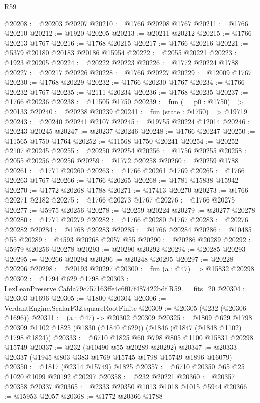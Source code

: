 \begin{lexlean}{R59}
\begin{coremodule}
@20208 := @20203 @20207
@20210 := @1766 @20208 @1767
@20211 := @1766 @20210
@20212 := @1920 @20205
@20213 := @20211 @20212
@20215 := @1766 @20213 @1767
@20216 := @1768 @20215
@20217 := @1766 @20216
@20221 := @5379 @20180 @20183 @20186 @15954
@20222 := @2055 @20221
@20223 := @1923 @20205
@20224 := @20222 @20223
@20226 := @1772 @20224 @1788
@20227 := @20217 @20226
@20228 := @1766 @20227
@20229 := @12009 @1767
@20230 := @1768 @20229
@20232 := @1766 @20230 @1767
@20234 := @1766 @20232 @1767
@20235 := @2111 @20234
@20236 := @1768 @20235
@20237 := @1766 @20236
@20238 := @11505 @1750
@20239 := fun (__p0 : @1750) => @20133
@20240 := @20238 @20239
@20241 := fun (state : @1750) => @19719
@20243 := @20240 @20241 @2107
@20245 := @19755 @20224 @12014
@20246 := @20243 @20245
@20247 := @20237 @20246
@20248 := @1766 @20247
@20250 := @11565 @1750 @1764
@20252 := @11568 @1750 @20241
@20254 := @20252 @2107 @20245
@20255 := @20250 @20254
@20256 := @1756 @20255
@20258 := @2055 @20256 @20256
@20259 := @1772 @20258
@20260 := @20259 @1788
@20261 := @1771 @20260
@20263 := @1766 @20261 @1769
@20265 := @1766 @20263 @1767
@20266 := @1766 @20265
@20268 := @1781 @15838 @15942
@20270 := @1772 @20268 @1788
@20271 := @17413 @20270
@20273 := @1766 @20271 @2182
@20275 := @1766 @20273 @1767
@20276 := @1766 @20275
@20277 := @5975 @20256
@20278 := @20259 @20224
@20279 := @20277 @20278
@20280 := @1771 @20279
@20282 := @1766 @20280 @1767
@20283 := @20276 @20282
@20284 := @1768 @20283
@20285 := @1766 @20284
@20286 := @10485 @55
@20289 := @4593 @20268 @2057 @55
@20290 := @20286 @20289
@20292 := @5979 @20256 @20278
@20293 := @20290 @20292
@20294 := @20285 @20293
@20295 := @20266 @20294
@20296 := @20248 @20295
@20297 := @20228 @20296
@20298 := @20193 @20297
@20300 := fun (a : @47) => @15832 @20298
@20302 := @1794 @629 @1798
@20303 := LexLeanPreserve.Cafda79c757163ffe4c6f07f487422bdf.R59.__fits_20
@20304 := @20303 @1696
@20305 := @1800 @20304
@20306 := VerdantEngine.ScalarF32.squareRootFinite
@20309 := @20305 (@232 (@20306 @1696))
@20311 := (a : @47) -> @20302 @20309
@20325 := @1809
    @629
    @1798
    @20309
    @1102
    @1825
    (@1830 (@1840 @629))
    (@1846 (@1847 (@1848 @1102) @1798 @1824))
@20333 := @6710 @1825 @60 @798 @805 @1100 @15831 @20298 @15749
@20337 := @232 (@10490 @55 @20289 @20292)
@20347 := @20333 @20337 (@1945 @803 @383 @1769 @15745 @1798 @15749 @1896 @16079)
@20350 := @1817 (@2314 @15749) @1825
@20357 := @6710 @20350 @65 @25 @1020 @1099 @20192 @20297
@20358 := @232 @20221
@20360 := @20357 @20358 @20337
@20365 := @2333 @20350 @1013 @1018 @1015 @5944
@20366 := @15953 @2057
@20368 := @1772 @20366 @1788

\end{coremodule}
\end{lexlean}
